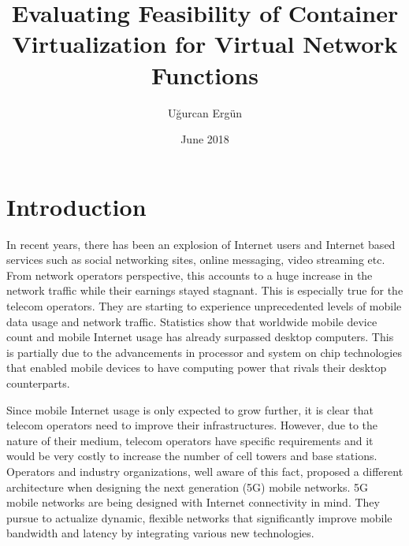 \documentclass[12pt,oneandhalf,chaparabic,ceng,ms,eng,oneside,pntc]{gsufbe}
\author{Uğurcan Ergün}
\title{Evaluating Feasibility of Container Virtualization for Virtual Network Functions}
\date{June 2018}
\begin{document}
\addtolength{\textheight}{1.5cm}
\newlength\myindent
\setlength\myindent{6em}
\newcommand\bindent{%
  \begingroup
  \setlength{\itemindent}{\myindent}
  \addtolength{\algorithmicindent}{\myindent}
}
\newcommand\eindent{\endgroup}
\begin{preliminaries}

\end{preliminaries}
%
%
%
\newtheorem{thm}{Definition}[chapter]
\renewcommand{\thethm}{\arabic{chapter}.\arabic{thm}}
\newtheorem{prp}{Proposition}[chapter]
\renewcommand{\theprp}{\arabic{chapter}.\arabic{prp}}
\newenvironment{prf}{\noindent{\bf Proof}}{$\hfill \Box$ \vspace{10pt}}

\chapter{Introduction}
In recent years, there has been an explosion of Internet users and Internet based services such as
social networking sites, online messaging, video streaming etc.  From network operators perspective, this
accounts to a huge increase in the network traffic while their earnings stayed stagnant.  This is 
especially true for the
telecom operators.  They are starting to experience unprecedented levels of mobile data usage and
network traffic.  Statistics show that worldwide mobile device count and mobile Internet usage has 
already surpassed desktop computers.  This is partially due to the advancements in processor and system
on chip technologies that enabled mobile devices to have computing power that rivals their desktop
counterparts. 

Since mobile Internet usage is only expected to grow further, it is clear that telecom operators need
to improve their infrastructures.  However, due to the nature of their medium, telecom operators have specific
requirements and it would be very costly to increase the number of cell towers and base
stations.  Operators and industry organizations, well aware of this fact, proposed a different
architecture when designing the next generation (5G) mobile networks.  5G mobile networks are being
designed with Internet connectivity in mind.  They pursue to actualize dynamic, flexible networks that
significantly improve mobile bandwidth and latency by integrating various new technologies.
\end{document}
